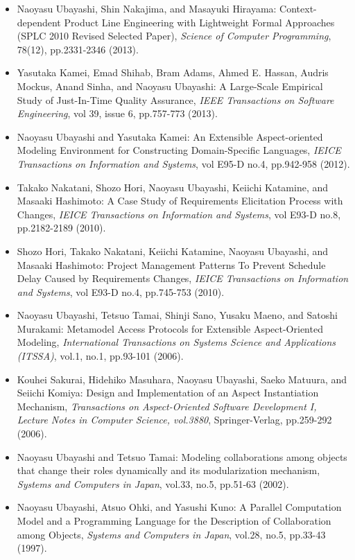 \documentclass{article}
\begin{document}
\begin{itemize}
\item Naoyasu Ubayashi, Shin Nakajima, and Masayuki Hirayama:
Context-dependent Product Line Engineering with Lightweight Formal Approaches (SPLC 2010 Revised Selected Paper),
{\em Science of Computer Programming}, 78(12), pp.2331-2346 (2013).

\item Yasutaka Kamei, Emad Shihab, Bram Adams, Ahmed E. Hassan, Audris Mockus, Anand Sinha, and Naoyasu Ubayashi:
A Large-Scale Empirical Study of Just-In-Time Quality Assurance,
{\em IEEE Transactions on Software Engineering}, vol 39, issue 6, pp.757-773 (2013).

\item Naoyasu Ubayashi and Yasutaka Kamei:
An Extensible Aspect-oriented Modeling Environment for Constructing Domain-Specific Languages,
{\em IEICE Transactions on Information and Systems}, vol E95-D no.4, pp.942-958 (2012).

\item Takako Nakatani, Shozo Hori, Naoyasu Ubayashi, Keiichi Katamine, and Masaaki Hashimoto:
A Case Study of Requirements Elicitation Process with Changes,
{\em IEICE Transactions on Information and Systems}, vol E93-D no.8, pp.2182-2189 (2010).

\item Shozo Hori, Takako Nakatani, Keiichi Katamine, Naoyasu Ubayashi, and Masaaki Hashimoto:
Project Management Patterns To Prevent Schedule Delay Caused by Requirements Changes,
{\em IEICE Transactions on Information and Systems}, vol E93-D no.4, pp.745-753 (2010).

\item Naoyasu Ubayashi, Tetsuo Tamai, Shinji Sano, Yusaku Maeno, and Satoshi Murakami:
Metamodel Access Protocols for Extensible Aspect-Oriented Modeling,
{\em International Transactions on Systems Science and Applications (ITSSA)},
vol.1, no.1, pp.93-101 (2006).

\item Kouhei Sakurai, Hidehiko Masuhara, Naoyasu Ubayashi, Saeko Matuura, and Seiichi Komiya: 
Design and Implementation of an Aspect Instantiation Mechanism,
{\em Transactions on Aspect-Oriented Software Development I,
Lecture Notes in Computer Science, vol.3880}, Springer-Verlag,
pp.259-292 (2006).

\item Naoyasu Ubayashi and Tetsuo Tamai:
Modeling collaborations among objects that change their roles dynamically and its modularization mechanism,
{\em Systems and Computers in Japan},
vol.33, no.5, pp.51-63 (2002).

\item Naoyasu Ubayashi, Atsuo Ohki, and Yasushi Kuno: 
A Parallel Computation Model and a Programming Language 
for the Description of Collaboration among Objects,
{\em Systems and Computers in Japan},
vol.28, no.5, pp.33-43 (1997).
\end{itemize}
\end{document}
